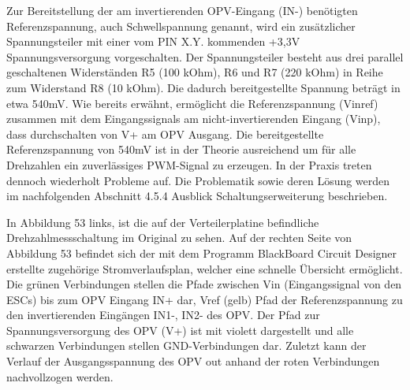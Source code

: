 Zur Bereitstellung der am invertierenden OPV-Eingang (IN-) benötigten Referenzspannung, auch Schwellspannung genannt, wird ein zusätzlicher Spannungsteiler mit einer vom PIN X.Y. kommenden +3,3V Spannungsversorgung vorgeschalten. Der Spannungsteiler besteht aus drei parallel geschaltenen Widerständen R5 (100 kOhm), R6 und R7 (220 kOhm) in Reihe zum Widerstand R8 (10 kOhm). Die dadurch bereitgestellte Spannung beträgt in etwa 540mV.  Wie bereits erwähnt, ermöglicht die Referenzspannung (Vinref) zusammen mit dem Eingangssignals am nicht-invertierenden Eingang (Vinp), dass durchschalten von V+ am OPV Ausgang. Die bereitgestellte Referenzspannung von 540mV ist in der Theorie ausreichend um für alle Drehzahlen ein zuverlässiges PWM-Signal zu erzeugen. In der Praxis treten dennoch wiederholt Probleme auf. Die Problematik sowie deren Lösung werden im nachfolgenden Abschnitt 4.5.4 \glqq{}Ausblick Schaltungserweiterung\grqq{} beschrieben. \vspace{11pt}

In Abbildung 53 links, ist die auf der Verteilerplatine befindliche Drehzahlmessschaltung im Original zu sehen. Auf der rechten Seite von Abbildung 53 befindet sich der mit dem Programm BlackBoard Circuit Designer erstellte zugehörige Stromverlaufsplan, welcher eine schnelle Übersicht ermöglicht. Die grünen Verbindungen stellen die Pfade zwischen Vin (Eingangssignal von den ESCs) bis zum OPV Eingang IN+ dar, Vref (gelb) Pfad der Referenzspannung zu den invertierenden Eingängen IN1-, IN2- des OPV. Der Pfad zur Spannungsversorgung des OPV (V+) ist mit violett dargestellt und alle schwarzen Verbindungen stellen GND-Verbindungen dar. Zuletzt kann der Verlauf der Ausgangsspannung des OPV out anhand der roten Verbindungen nachvollzogen werden. 

